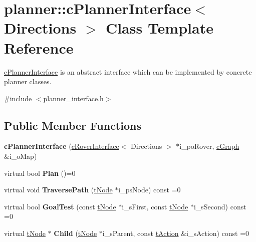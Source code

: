 \hypertarget{classplanner_1_1c_planner_interface}{}\section{planner\+:\+:c\+Planner\+Interface$<$ Directions $>$ Class Template Reference}
\label{classplanner_1_1c_planner_interface}


\mbox{\hyperlink{classplanner_1_1c_planner_interface}{c\+Planner\+Interface}} is an abstract interface which can be implemented by concrete planner classes.  




{\ttfamily \#include $<$planner\+\_\+interface.\+h$>$}

\subsection*{Public Member Functions}
\begin{DoxyCompactItemize}
\item 
\mbox{\label{classplanner_1_1c_planner_interface_aa3c1b1467ed9cc94fb293339c04924d1}} 
{\bfseries c\+Planner\+Interface} (\mbox{\hyperlink{classplanner_1_1c_rover_interface}{c\+Rover\+Interface}}$<$ Directions $>$ $\ast$i\+\_\+po\+Rover, \mbox{\hyperlink{classplanner_1_1c_graph}{c\+Graph}} \&i\+\_\+o\+Map)
\item 
\mbox{\label{classplanner_1_1c_planner_interface_a3af8b639c6fe090f4013ecefaf31ed21}} 
virtual bool {\bfseries Plan} ()=0
\item 
\mbox{\label{classplanner_1_1c_planner_interface_a5c30b547b681b04434102fbcc7c72ea3}} 
virtual void {\bfseries Traverse\+Path} (\mbox{\hyperlink{structplanner_1_1t_node}{t\+Node}} $\ast$i\+\_\+ps\+Node) const =0
\item 
\mbox{\label{classplanner_1_1c_planner_interface_aadc6ccb9088f755bd0ec30046bb79e99}} 
virtual bool {\bfseries Goal\+Test} (const \mbox{\hyperlink{structplanner_1_1t_node}{t\+Node}} $\ast$i\+\_\+s\+First, const \mbox{\hyperlink{structplanner_1_1t_node}{t\+Node}} $\ast$i\+\_\+s\+Second) const =0
\item 
\mbox{\label{classplanner_1_1c_planner_interface_a499d8d3b81b0090318f4f2ea044c084c}} 
virtual \mbox{\hyperlink{structplanner_1_1t_node}{t\+Node}} $\ast$ {\bfseries Child} (\mbox{\hyperlink{structplanner_1_1t_node}{t\+Node}} $\ast$i\+\_\+s\+Parent, const \mbox{\hyperlink{structplanner_1_1t_action}{t\+Action}} \&i\+\_\+s\+Action) const =0
\end{DoxyCompactItemize}
